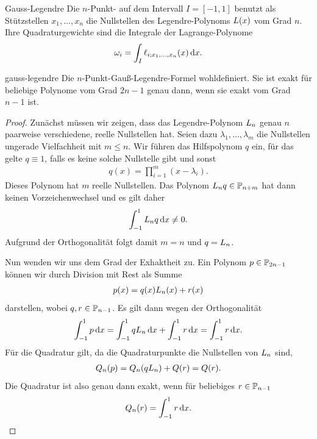 \begin{Definition}{Gauss-Legendre}
  Die $n$-Punkt- auf dem Intervall
  $I=[-1,1]$ benutzt als Stützstellen $x_1,\dots,x_n$ die Nullstellen
  des Legendre-Polynoms $\plegendre(x)$ vom Grad $n$. Ihre
  Quadraturgewichte sind die Integrale der Lagrange-Polynome
  \begin{gather}
    \omega_i = \int_I \plagrange_{i;x_1,\dots,x_n}(x)\dx.
  \end{gather}
\end{Definition}

\begin{Satz}{gauss-legendre}
  Die $n$-Punkt-Gauß-Legendre-Formel wohldefiniert. Sie ist exakt für
  beliebige Polynome vom Grad $2n-1$ genau dann, wenn sie exakt vom
  Grad $n-1$ ist.
\end{Satz}

\begin{proof}
  Zunächst müssen wir zeigen, dass das Legendre-Polynom $\plegendre_n$
  genau $n$ paarweise verschiedene, reelle Nullstellen hat. Seien dazu
  $\lambda_1,\dots,\lambda_m$ die Nullstellen ungerade Vielfachheit
  mit $m\le n$. Wir führen das Hilfspolynom $q$ ein, für das gelte
  $q\equiv 1$, falls es keine solche Nullstelle gibt und sonst
  \begin{gather}
    q(x) = \prod_{i=1}^m (x-\lambda_i).
  \end{gather}
  Dieses Polynom hat $m$ reelle Nullstellen.
  Das Polynom $\plegendre_nq \in \P_{n+m}$ hat dann keinen Vorzeichenwechsel
  und es gilt daher
  \begin{gather}
    \int_{-1}^1 \plegendre_n q \dx \neq 0.
  \end{gather}
  Aufgrund der Orthogonalität folgt damit $m=n$ und $q=\plegendre_n$.

  Nun wenden wir uns dem Grad der Exhaktheit zu.  Ein Polynom
  $p\in \P_{2n-1}$ können wir durch Division mit Rest als Summe
  \begin{gather}
    p(x) = q(x)\plegendre_n(x) + r(x)
  \end{gather}
  darstellen, wobei $q,r\in \P_{n-1}$. Es gilt dann wegen der Orthogonalität
  \begin{gather}
    \int_{-1}^1 p\dx
    = \int_{-1}^1 q\plegendre_n \dx + \int_{-1}^1 r\dx
    = \int_{-1}^1 r\dx.
  \end{gather}
  Für die Quadratur gilt, da die Quadraturpunkte die Nullstellen von
  $\plegendre_n$ sind,
  \begin{gather}
    Q_n(p) = Q_n(q\plegendre_n) + Q(r) = Q(r).
  \end{gather}
  Die Quadratur ist also genau dann exakt, wenn für beliebiges $r\in \P_{n-1}$
  \begin{gather}
    Q_n(r) = \int_{-1}^1 r\dx.
  \end{gather}
\end{proof}

